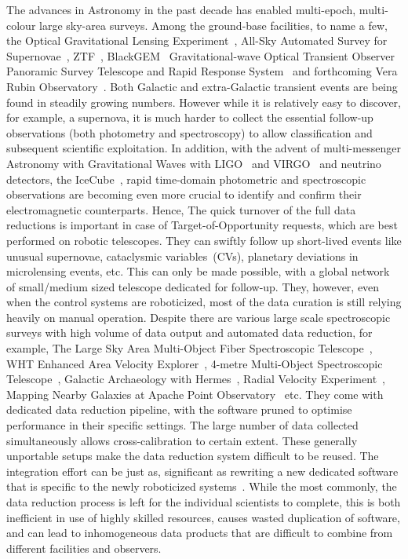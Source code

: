 \documentclass{aa}
\begin{document}
The advances in Astronomy in the past decade has enabled multi-epoch, multi-colour
large sky-area surveys. Among the ground-base facilities, to name a few, the
Optical Gravitational Lensing Experiment~\citep[OGLE]{2015AcA....65....1U},
All-Sky Automated Survey for Supernovae~\citep[ASAS-SN]{2017PASP..129j4502K},
ZTF~\citep[Zwicky Transient Facility]{2019PASP..131a8003M},
BlackGEM~\citep[BlackGEM]{2015ASPC..496..254B}
Gravitational-wave Optical Transient Observer~\citep[GOTO]{2020SPIE11445E..7GD}
Panoramic Survey Telescope and Rapid Response System~\citep[Pan-STARRS]{2016arXiv161205560C}
and forthcoming Vera Rubin Observatory~\citep[VRO]{2019ApJ...873..111I}. Both Galactic
and extra-Galactic transient events are being found in steadily growing numbers.
However while it is relatively easy to discover, for example, a supernova, it is much
harder to collect the essential follow-up observations (both photometry and spectroscopy)
to allow classification and subsequent scientific exploitation. In addition, with the
advent of multi-messenger Astronomy with Gravitational Waves with
LIGO~\citep{2015CQGra..32g4001L} and VIRGO~\citep{2015CQGra..32b4001A} and neutrino
detectors, the IceCube~\citep{2006APh....26..155I}, rapid time-domain photometric and
spectroscopic observations are becoming even more crucial to identify and confirm their
electromagnetic counterparts. Hence, The quick turnover of the full data reductions is
important in case of Target-of-Opportunity requests, which are best performed on robotic
telescopes. They can swiftly follow up short-lived events like unusual supernovae,
cataclysmic variables~(CVs), planetary deviations in microlensing events, etc. This can only be
made possible, with a global network of small/medium sized telescope dedicated for
follow-up. They, however, even when the control systems are roboticized, most of the
data curation is still relying heavily on manual operation. Despite there are various
large scale spectroscopic surveys with high volume of data output and automated data
reduction, for example, The Large Sky Area Multi-Object Fiber Spectroscopic
Telescope~\citep[LAMOST]{2012RAA....12.1197C}, WHT Enhanced Area Velocity
Explorer~\citep[WEAVE]{2012SPIE.8446E..0PD}, 4-metre Multi-Object Spectroscopic
Telescope~\citep[4MOST]{2019Msngr.175....3D}, Galactic Archaeology with
Hermes~\citep[GALAH]{2015MNRAS.449.2604D}, Radial Velocity
Experiment~\citep[RAVE]{2020AJ....160...82S}, Mapping Nearby Galaxies at Apache Point
Observatory~\citep[MaNGA]{2015ApJ...798....7B} etc. They come with dedicated data
reduction pipeline, with the software pruned to optimise performance in their specific
settings. The large number of data collected simultaneously allows cross-calibration
to certain extent. These generally unportable setups make the data reduction system
difficult to be reused. The integration effort can be just as, significant
as rewriting a new dedicated software that is specific to the newly roboticized
systems~\citep{2010SPIE.7740E..0WT}. While the most commonly, the data reduction process
is left for the individual scientists to complete, this is both inefficient in use of
highly skilled resources, causes wasted duplication of software, and can lead to
inhomogeneous data products that are difficult to combine from different facilities and
observers.
\end{document}
